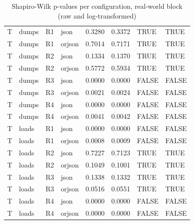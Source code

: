 \begin{table}[ht]
\begin{tabular}{llllrrll}
  T & dumps & R1 & json & 0.3280 & 0.3372 & TRUE & TRUE \\ 
  T & dumps & R1 & orjson & 0.7014 & 0.7171 & TRUE & TRUE \\ 
  T & dumps & R2 & json & 0.1334 & 0.1370 & TRUE & TRUE \\ 
  T & dumps & R2 & orjson & 0.5772 & 0.5934 & TRUE & TRUE \\ 
  T & dumps & R3 & json & 0.0000 & 0.0000 & FALSE & FALSE \\ 
  T & dumps & R3 & orjson & 0.0021 & 0.0024 & FALSE & FALSE \\ 
  T & dumps & R4 & json & 0.0000 & 0.0000 & FALSE & FALSE \\ 
  T & dumps & R4 & orjson & 0.0041 & 0.0042 & FALSE & FALSE \\ 
  T & loads & R1 & json & 0.0000 & 0.0000 & FALSE & FALSE \\ 
  T & loads & R1 & orjson & 0.0008 & 0.0009 & FALSE & FALSE \\ 
  T & loads & R2 & json & 0.7227 & 0.7123 & TRUE & TRUE \\ 
  T & loads & R2 & orjson & 0.1049 & 0.1001 & TRUE & TRUE \\ 
  T & loads & R3 & json & 0.1338 & 0.1332 & TRUE & TRUE \\ 
  T & loads & R3 & orjson & 0.0516 & 0.0551 & TRUE & TRUE \\ 
  T & loads & R4 & json & 0.0000 & 0.0000 & FALSE & FALSE \\ 
  T & loads & R4 & orjson & 0.0000 & 0.0000 & FALSE & FALSE \\ 
   \bottomrule
\end{tabular}
\caption{Shapiro-Wilk p-values per configuration, real-world block (raw and log-transformed)} 
\label{tab:rw_normality}
\end{table}
